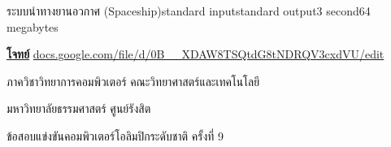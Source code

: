 \documentclass[11pt,a4paper]{article}
\begin{document}
\begin{problem}{ระบบนำทางยานอวกาศ (Spaceship)}{standard input}{standard output}{3 second}{64 megabytes}

\underline{\textbf{โจทย์}} \url{docs.google.com/file/d/0B__XDAW8TSQtdG8tNDRQV3cxdVU/edit}

\Examples

\begin{example}
%
%
\end{example}


\Source

ภาควิชาวิทยาการคอมพิวเตอร์ คณะวิทยาศาสตร์และเทคโนโลยี

มหาวิทยาลัยธรรมศาสตร์ ศูนย์รังสิต

ข้อสอบแข่งขันคอมพิวเตอร์โอลิมปิกระดับชาติ ครั้งที่ 9

\end{problem}
\end{document}

